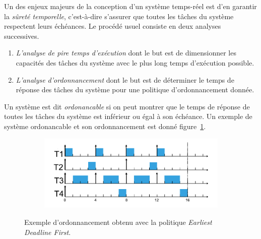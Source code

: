 Un des enjeux majeurs de la conception d'un système temps-réel est d'en garantir la \emph{sûreté temporelle}, c'est-à-dire s'assurer que toutes les tâches du système respectent leurs échéances.
Le procédé usuel consiste en deux analyses successives.

\begin{enumerate}
	\item \emph{L'analyse de pire temps d'exécution} dont le but est de dimensionner les capacités des tâches du système avec le plus long temps d'exécution possible.
	\item \emph{L'analyse d'ordonnancement} dont le but est de déterminer le temps de réponse des tâches du système pour une politique d'ordonnancement donnée.
\end{enumerate}

Un système est dit \emph{ordonancable} si on peut montrer  que le temps de réponse de toutes les tâches du système est inférieur ou égal à son échéance.
Un exemple de système ordonancable et son ordonnancement est donné figure~\ref{fig:exemple_ordonancement_tr}.

\begin{figure}
	\begin{subfigure}{0,6\linewidth}
		\centering
		\includegraphics[width=\linewidth]{graphics/figures/sched_rt.pdf}
	\end{subfigure}
	\begin{subfigure}{0,4\linewidth}
		\centering
	\end{subfigure}
	\caption{\label{fig:exemple_ordonancement_tr}Exemple d'ordonnancement obtenu avec la politique \emph{Earliest Deadline First}.}
\end{figure}

